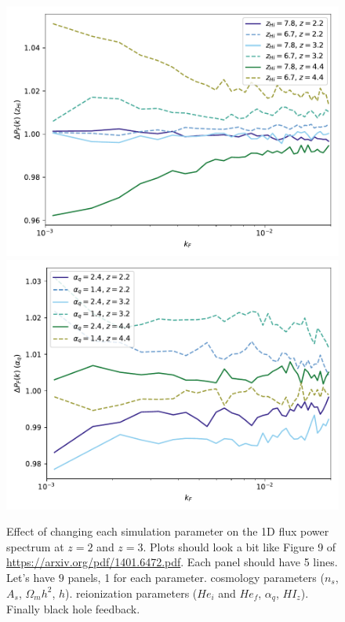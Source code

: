 \documentclass[a4paper,11pt]{article}
\begin{document}
\begin{figure}
    \centering
	\includegraphics[width=0.48\columnwidth]{figures/single_param_hireionz.pdf}
    \includegraphics[width=0.48\columnwidth]{figures/single_param_alphaq.pdf}

    \caption{Effect of changing each simulation parameter on the 1D flux power spectrum at $z=2$ and $z=3$. Plots should look a bit like Figure 9 of \url{https://arxiv.org/pdf/1401.6472.pdf}. Each panel should have 5 lines. Let's have $9$ panels, 1 for each parameter. cosmology parameters ($n_s$, $A_s$, $\Omega_m h^2$, $h$). reionization parameters ($He_i$ and $He_f$, $\alpha_q$, $HI_z$). Finally black hole feedback. }
    \label{fig:zhifluxpower}
\end{figure}
\end{document}
